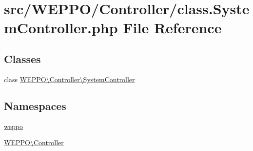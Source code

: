 \hypertarget{class_8SystemController_8php}{}\section{src/\+W\+E\+P\+P\+O/\+Controller/class.System\+Controller.\+php File Reference}
\label{class_8SystemController_8php}
\subsection*{Classes}
\begin{DoxyCompactItemize}
\item 
class \hyperlink{classWEPPO_1_1Controller_1_1SystemController}{W\+E\+P\+P\+O\textbackslash{}\+Controller\textbackslash{}\+System\+Controller}
\end{DoxyCompactItemize}
\subsection*{Namespaces}
\begin{DoxyCompactItemize}
\item 
 \hyperlink{namespaceweppo}{weppo}
\item 
 \hyperlink{namespaceWEPPO_1_1Controller}{W\+E\+P\+P\+O\textbackslash{}\+Controller}
\end{DoxyCompactItemize}
